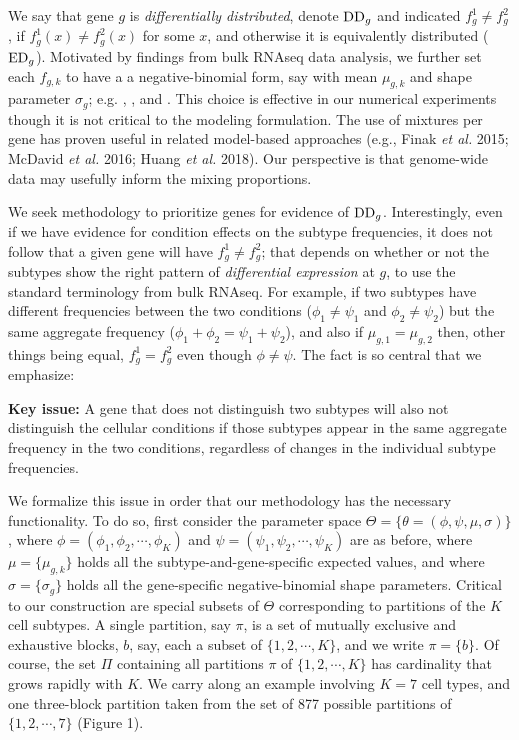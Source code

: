 \documentclass[aoas,preprint]{imsart}
\begin{document}
We say that gene $g$ is {\em differentially distributed}, denote ${\rm DD}_g$ and indicated
$f_g^1 \neq f_g^2$,
if $f_g^1(x) \neq f_g^2(x)$ for some $x$, and otherwise it is equivalently distributed
(${\rm ED}_g$). Motivated by findings from bulk RNAseq data analysis, we further
set each $f_{g,k}$ to have a a negative-binomial form, say with mean $\mu_{g,k}$
and shape parameter $\sigma_g$; e.g. \cite{ref:Leng}, \cite{DES}, and \cite{ref:Des}. 
This choice is effective in our numerical experiments though it is 
not critical to the modeling formulation.  The use of mixtures per gene has proven
useful in related model-based approaches (e.g., Finak {\em et al.} 2015; McDavid {\em et al.} 2016;
Huang {\em et al.} 2018).
Our perspective is that  genome-wide data may usefully inform the  mixing proportions.

We seek methodology to prioritize genes for evidence
of ${\rm DD}_g$.  Interestingly, even if we have evidence for condition effects
on the subtype frequencies, it does not follow that a given
gene will have $f^1_g \neq f^2_g$; that depends on whether or not the subtypes
show the right pattern of {\em differential expression} at $g$, to use the 
standard terminology from bulk RNAseq.  For example, if two subtypes have 
different frequencies between the two conditions ($\phi_1 \neq \psi_1$ and 
 $\phi_2 \neq \psi_2$) but the same aggregate frequency
($\phi_1+\phi_2 = \psi_1 + \psi_2$),  and also  if $\mu_{g,1} = \mu_{g,2}$
then, other things being equal, $f^1_g = f^2_g$ even though $\phi \neq \psi$. The fact
is so central that we emphasize:


\noindent
{\bf Key issue:} A gene that does not distinguish two subtypes will also not distinguish
the cellular conditions if those subtypes appear in the same aggregate frequency
in the two conditions, regardless of changes in the individual subtype 
frequencies. 

 We formalize this issue in order that our methodology
has the necessary functionality.  To do so,  first consider the parameter space 
$\Theta = \{ \theta=(\phi, \psi,\mu, \sigma)  \}$,
where $\phi=(\phi_1, \phi_2, \cdots, \phi_K)$ and $\psi=(\psi_1, \psi_2, \cdots, \psi_K)$ 
are as before, where $\mu = \{ \mu_{g,k} \}$ holds  all the subtype-and-gene-specific expected
values, and where $\sigma = \{ \sigma_g \}$ holds all the gene-specific negative-binomial
shape parameters.  Critical to our construction are special subsets of $\Theta$ corresponding
to partitions of the $K$ cell subtypes.  A single partition, say $\pi$, is a set of
mutually exclusive and exhaustive blocks, $b$, say, each a subset of $\{1, 2, 
\cdots, K\}$, and we write $\pi = \{ b \}$.  Of course,
the set $\Pi$ containing all partitions $\pi$ of $\{1,2, \cdots, K\}$
 has cardinality that grows rapidly with $K$. 
 We carry along an example
involving $K=7$ cell types, and one three-block partition taken
from the set of 877 possible partitions of $\{1, 2, \cdots, 7\}$ (Figure 1).
\end{document}
